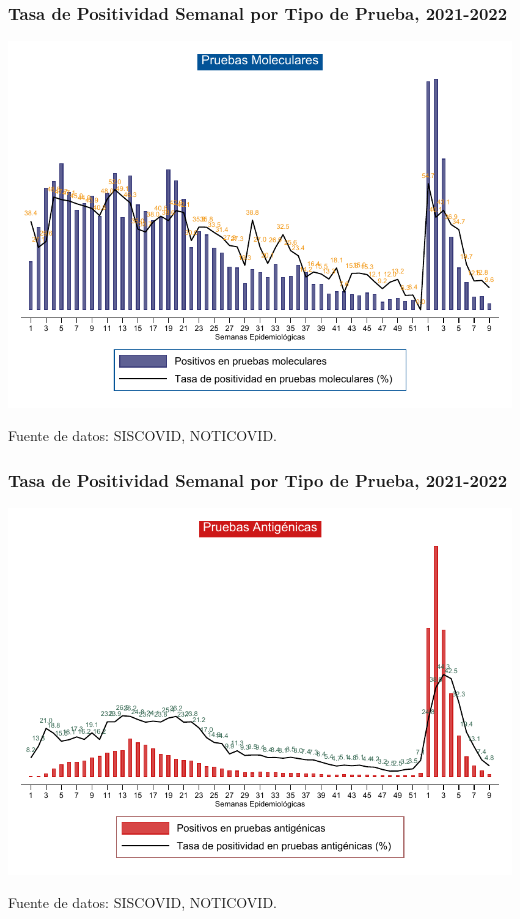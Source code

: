 \documentclass[xcolor=table]{beamer}
\begin{document}
\begin{frame}
		\frametitle{Tasa de Positividad Semanal por Tipo de Prueba, 2021-2022}
		\vspace{-.5cm}
		\begin{center}
			\includegraphics[width=0.8\linewidth]{../figuras/positividad_pcr.pdf}
		\end{center}
		{\tiny Fuente de datos: SISCOVID, NOTICOVID.}
\end{frame}
\begin{frame}
	\frametitle{Tasa de Positividad Semanal por Tipo de Prueba, 2021-2022}
	\vspace{-.5cm}
	\begin{center}
		\includegraphics[width=0.8\linewidth]{../figuras/positividad_ag.pdf}
	\end{center}
	{\tiny Fuente de datos: SISCOVID, NOTICOVID.}
\end{frame}
\end{document}
